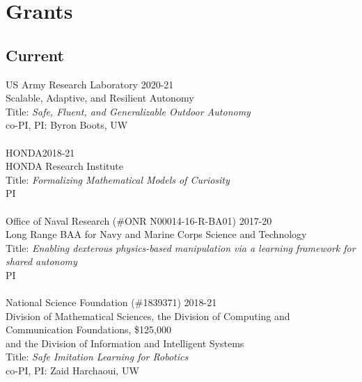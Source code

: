 
\section{Grants}

\subsection{Current}
\noindent
US Army Research Laboratory \hfill 2020-21\\
Scalable, Adaptive, and Resilient Autonomy 
\\
Title: \textit{Safe, Fluent, and Generalizable Outdoor Autonomy} \\
co-PI, PI: Byron Boots, UW\\
\\
HONDA\hfill 2018-21\\
HONDA Research Institute 
\\
Title: \textit{Formalizing Mathematical Models of Curiosity}\\
PI\\
\\
Office of Naval Research (\#ONR N00014-16-R-BA01) \hfill 2017-20\\
Long Range BAA for Navy and Marine Corps Science and Technology 
\\
Title: \textit{Enabling dexterous physics-based manipulation via a learning framework for shared autonomy}\\
PI\\
\\
National Science Foundation (\#1839371) \hfill 2018-21\\
Division of Mathematical Sciences, the Division of Computing and Communication Foundations, \hfill \$125,000
\\and the Division of Information and Intelligent Systems\\
Title: \textit{Safe Imitation Learning for Robotics}\\
co-PI, PI: Zaid Harchaoui, UW\\

